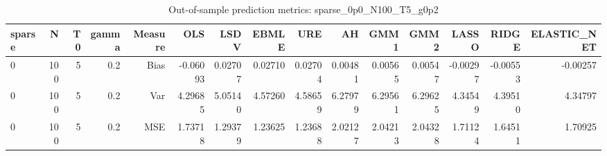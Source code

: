 \begin{table}[!htbp]\centering
\caption{Out-of-sample prediction metrics: sparse_0p0_N100_T5_g0p2}
\label{tab:table3_sparse_0p0_N100_T5_g0p2}
\begin{tabular}{lrrrrrrrrrrrrrr}
\hline
sparse & N & T0 & gamma & Measure & OLS & LSDV & EBMLE & URE & AH & GMM1 & GMM2 & LASSO & RIDGE & ELASTIC_NET \\
\hline
0 & 100 & 5 & 0.2 & Bias & -0.06093 & 0.02707 & 0.02710 & 0.02704 & 0.00481 & 0.00565 & 0.00547 & -0.00297 & -0.00553 & -0.00257 \\
0 & 100 & 5 & 0.2 & Var & 4.29685 & 5.05140 & 4.57260 & 4.58659 & 6.27979 & 6.29561 & 6.29625 & 4.34549 & 4.39510 & 4.34797 \\
0 & 100 & 5 & 0.2 & MSE & 1.73718 & 1.29379 & 1.23625 & 1.23688 & 2.02127 & 2.04213 & 2.04328 & 1.71124 & 1.64511 & 1.70925 \\
\hline
\end{tabular}
\end{table}

